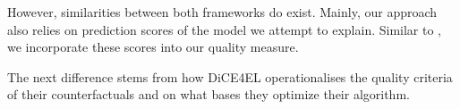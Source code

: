 \documentclass[./../../paper.tex]{subfiles}
\begin{document}
However, similarities between both frameworks do exist. Mainly, our approach also relies on prediction scores of the model we attempt to explain. Similar to \citeauthor{hsieh_DiCE4ELInterpretingProcess_2021}, we incorporate these scores into our quality measure. 

The next difference stems from how DiCE4EL operationalises the quality criteria of their counterfactuals and on what bases they optimize their algorithm. 
\end{document}
